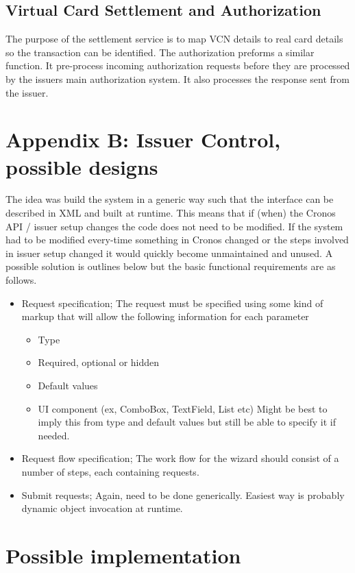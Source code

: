 \documentclass[a4paper, 11pt, titlepage]{article}
\begin{document}
\subsection{Virtual Card Settlement and Authorization} 
The purpose of the settlement service is to map VCN details to real card details so the transaction can be identified.
The authorization preforms a similar function. It pre-process incoming authorization requests before they are processed by the issuers main authorization system. It also processes the response sent from the issuer.
 
 
\cite{Orbiscom_Arch} 

\label{issuer_control}
\section{Appendix B: Issuer Control, possible designs}
The idea was build the system in a generic way such that the interface can be described in XML and built at runtime. This means that if (when) the Cronos API / issuer setup changes the code does not need to be modified. If the system had to be modified every-time something in Cronos changed or the steps involved in issuer setup changed it would quickly become unmaintained and unused.  A possible solution is outlines below but the basic functional requirements are as follows.
\begin{itemize}
\item Request specification; The request must be specified using some kind of markup that will allow the following information for each parameter \label{section:required metadata}
	\begin{itemize}
	\item Type
	\item Required, optional or hidden
	\item Default values
	\item UI component (ex, ComboBox, TextField, List etc) Might be best to imply this from type and default values but still be able to specify it if needed.
	\end{itemize}
\item Request flow specification; The work flow for the wizard should consist of a number of steps, each containing requests.
\item Submit requests; Again, need to be done generically. Easiest way is probably dynamic object invocation at runtime.
\end{itemize}
\section{Possible implementation}
\end{document}

